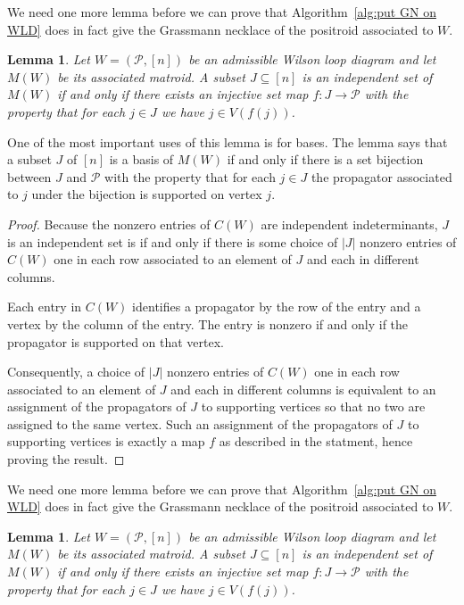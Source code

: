 \documentclass[11pt]{article}
\newcommand{\cP}{\mathcal{P}}
\newtheorem{lem}[thm]{Lemma}
\theoremstyle{remark}
\theoremstyle{definition}
\begin{document}
We need one more lemma before we can prove that Algorithm~\ref{alg:put GN on WLD} does in fact give the Grassmann necklace of the positroid associated to $W$.

\begin{lem}\label{lem basis as perm}
Let $W = (\cP,[n])$ be an admissible Wilson loop diagram and let $M(W)$ be its associated matroid. A subset $J \subseteq [n]$ is an independent set of $M(W)$ if and only if there exists an injective set map $f : J \rightarrow \cP$ with the property that for each $j\in J$ we have $j \in V(f(j))$.
\end{lem}

One of the most important uses of this lemma is for bases.  The lemma says that a subset $J$ of $[n]$ is a basis of $M(W)$ if and only if there is a set bijection between $J$ and $\cP$ with the property that for each $j\in J$ the propagator associated to $j$ under the bijection is supported on vertex $j$.

\begin{proof}
  Because the nonzero entries of $C(W)$ are independent indeterminants,
  $J$ is an independent set is if and only if there is some choice of $|J|$ nonzero entries of $C(W)$ one in each row associated to an element of $J$ and each in different columns.

  Each entry in $C(W)$ identifies a propagator by the row of the entry and a vertex by the column of the entry.  The entry is nonzero if and only if the propagator is supported on that vertex.
  
  Consequently, a choice of $|J|$ nonzero entries of $C(W)$ one in each row associated to an element of $J$ and each in different columns is equivalent to an assignment of the propagators of $J$ to supporting vertices so that no two are assigned to the same vertex.  Such an assignment of the propagators of $J$ to supporting vertices is exactly a map $f$ as described in the statment, hence proving the result.
\end{proof}


We need one more lemma before we can prove that Algorithm~\ref{alg:put GN on WLD} does in fact give the Grassmann necklace of the positroid associated to $W$.

\begin{lem}\label{lem basis as perm}
Let $W = (\cP,[n])$ be an admissible Wilson loop diagram and let $M(W)$ be its associated matroid. A subset $J \subseteq [n]$ is an independent set of $M(W)$ if and only if there exists an injective set map $f : J \rightarrow \cP$ with the property that for each $j\in J$ we have $j \in V(f(j))$.
\end{lem}
\end{document}
